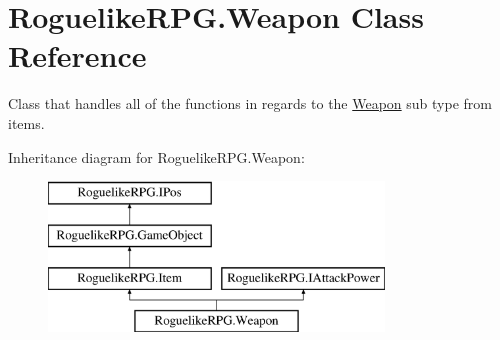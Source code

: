 \hypertarget{class_roguelike_r_p_g_1_1_weapon}{}\section{Roguelike\+R\+P\+G.\+Weapon Class Reference}
\label{class_roguelike_r_p_g_1_1_weapon}


Class that handles all of the functions in regards to the \mbox{\hyperlink{class_roguelike_r_p_g_1_1_weapon}{Weapon}} sub type from items.  


Inheritance diagram for Roguelike\+R\+P\+G.\+Weapon\+:\begin{figure}[H]
\begin{center}
\leavevmode
\includegraphics[height=4.000000cm]{class_roguelike_r_p_g_1_1_weapon}
\end{center}
\end{figure}
